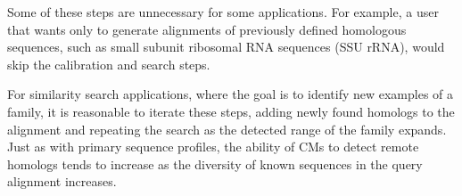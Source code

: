 Some of these steps are unnecessary for some applications. For
example, a user that wants only to generate alignments of previously
defined homologous sequences, such as small subunit ribosomal RNA
sequences (SSU rRNA), would skip the calibration and search steps. 

For similarity search applications, where the goal is to identify new
examples of a family, it is reasonable to iterate these steps, adding
newly found homologs to the alignment and repeating the search as the
detected range of the family expands. Just as with primary sequence
profiles, the ability of CMs to detect remote homologs tends to
increase as the diversity of known sequences in the query alignment
increases.
